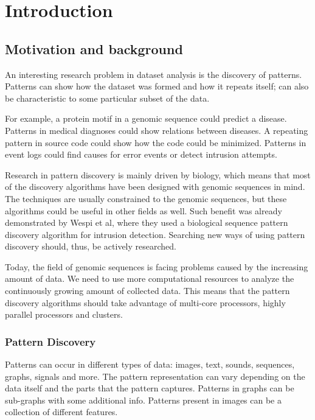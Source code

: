 \chapter{Introduction}
\label{c:introduction}

\section{Motivation and background}

An interesting research problem in dataset analysis is the discovery of patterns. Patterns can show how the dataset was formed and how it repeats itself; can also be characteristic to some particular subset of the data.

For example, a protein motif in a genomic sequence could predict a disease. Patterns in medical diagnoses could show relations between diseases. A repeating pattern in source code could show how the code could be minimized. Patterns in event logs could find causes for error events or detect intrusion attempts.

Research in pattern discovery is mainly driven by biology, which means that most of the discovery algorithms have been designed with genomic sequences in mind. The techniques are usually constrained to the genomic sequences, but these algorithms could be useful in other fields as well. Such benefit was already demonstrated by Wespi et al\cite{IntrusionDetection}, where they used a biological sequence pattern discovery algorithm for intrusion detection. Searching new ways of using pattern discovery should, thus, be actively researched.

Today, the field of genomic sequences is facing problems caused by the increasing amount of data\cite{BigData,HowIsGenomeDoing}. We need to use more computational resources to analyze the continuously growing amount of collected data. This means that the pattern discovery algorithms should take advantage of multi-core processors, highly parallel processors and clusters.

\subsection{Pattern Discovery}

Patterns can occur in different types of data: images, text, sounds, sequences, graphs, signals and more. The pattern representation can vary depending on the data itself and the parts that the pattern captures. Patterns in graphs can be sub-graphs with some additional info. Patterns present in images can be a collection of different features.

